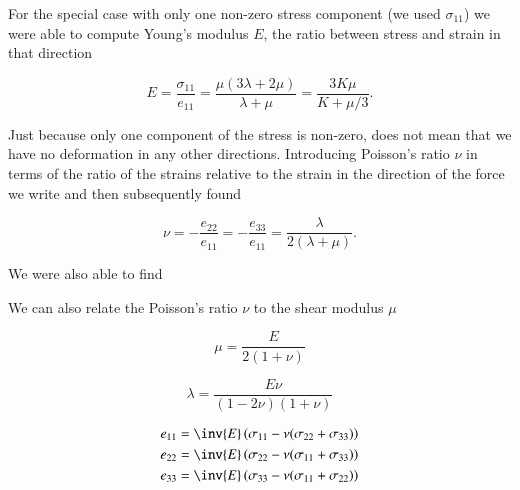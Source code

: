For the special case with only one non-zero stress component (we used $\sigma_{11}$) we were able to compute Young's modulus $E$, the ratio between stress and strain in that direction

\begin{equation}\label{eqn:continuumElasticityReview:410}
E = \frac{\sigma_{11}}{e_{11}} = \frac{\mu(3 \lambda + 2 \mu)}{\lambda + \mu }  = \frac{3 K \mu}{K + \mu/3}.
\end{equation}

Just because only one component of the stress is non-zero, does not mean that we have no deformation in any other directions.  Introducing Poisson's ratio $\nu$ in terms of the ratio of the strains relative to the strain in the direction of the force we write and then subsequently found

\begin{equation}\label{eqn:continuumElasticityReview:430}
\nu = -\frac{e_{22}}{e_{11}} = -\frac{e_{33}}{e_{11}} = \frac{\lambda}{2(\lambda + \mu)}.
\end{equation}

We were also able to find

We can also relate the Poisson's ratio $\nu$ to the shear modulus $\mu$

\begin{equation}\label{eqn:continuumElasticityReview:450}
\mu = \frac{E}{2(1 + \nu)}
\end{equation}

\begin{equation}\label{eqn:continuumElasticityReview:470}
\lambda = \frac{E \nu}{(1 - 2 \nu)(1 + \nu)}
\end{equation}

\begin{align}\label{eqn:continuumElasticityReview:490}
e_{11} &= \inv{E}\left( \sigma_{11} - \nu(\sigma_{22} + \sigma_{33}) \right) \\
e_{22} &= \inv{E}\left( \sigma_{22} - \nu(\sigma_{11} + \sigma_{33}) \right) \\
e_{33} &= \inv{E}\left( \sigma_{33} - \nu(\sigma_{11} + \sigma_{22}) \right)
\end{align}
